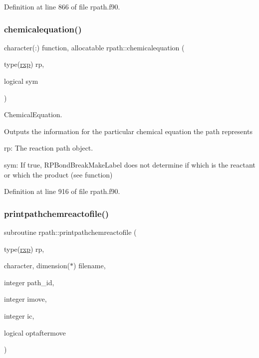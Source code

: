 Definition at line 866 of file rpath.\+f90.

\mbox{\label{namespacerpath_aaa967f303c4ed7b7f102c7dad27ab206}} 
\subsubsection{\texorpdfstring{chemicalequation()}{chemicalequation()}}
{\footnotesize\ttfamily character(\+:) function, allocatable rpath\+::chemicalequation (\begin{DoxyParamCaption}\item[{type(\mbox{\hyperlink{structrpath_1_1rxp}{rxp}})}]{rp,  }\item[{logical}]{sym }\end{DoxyParamCaption})}



Chemical\+Equation. 

Outputs the information for the particular chemical equation the path represents


\begin{DoxyItemize}
\item rp\+: The reaction path object.
\item sym\+: If true, R\+P\+Bond\+Break\+Make\+Label does not determine if which is the reactant or which the product (see function) 
\end{DoxyItemize}

Definition at line 916 of file rpath.\+f90.

\mbox{\label{namespacerpath_a50f2511a42a3608e9eab945405ba1a93}} 
\subsubsection{\texorpdfstring{printpathchemreactofile()}{printpathchemreactofile()}\hspace{0.1cm}{\footnotesize\ttfamily [1/2]}}
{\footnotesize\ttfamily subroutine rpath\+::printpathchemreactofile (\begin{DoxyParamCaption}\item[{type(\mbox{\hyperlink{structrpath_1_1rxp}{rxp}})}]{rp,  }\item[{character, dimension($\ast$)}]{filename,  }\item[{integer}]{path\+\_\+id,  }\item[{integer}]{imove,  }\item[{integer}]{ic,  }\item[{logical}]{optaftermove }\end{DoxyParamCaption})}



